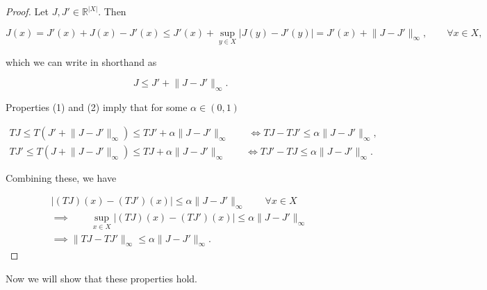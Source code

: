 \begin{proof}

Let \(J, J' \in \mathbb{R}^{|X|}\). Then

\[
J(x) = J'(x) + J(x) - J'(x) \leq J'(x) + \sup_{y \in X} \left| J(y) - J'(y) \right| = J'(x) + \lVert J - J' \rVert_\infty, \qquad \forall x \in X,
\]

which we can write in shorthand as

\[
J \leq J' + \lVert J - J' \rVert_\infty.
\]

Properties (1) and (2) imply that for some \(\alpha \in (0,1)\)

\begin{multline*}
TJ \leq T(J' + \lVert J - J' \rVert_\infty) \leq TJ' +  \alpha \lVert J - J' \rVert_\infty \qquad \iff TJ- TJ' \leq \alpha \lVert J - J' \rVert_\infty,  
\\ TJ' \leq T(J + \lVert J - J' \rVert_\infty) \leq TJ +  \alpha \lVert J - J' \rVert_\infty \qquad \iff TJ' - TJ \leq \alpha \lVert J - J' \rVert_\infty.
\end{multline*}

Combining these, we have

\begin{multline*}
 \left| (TJ)(x) - (TJ')(x)  \right|  \leq \alpha \lVert J - J' \rVert_\infty \qquad \forall x \in X
\\ \implies \qquad \sup_{x \in X} \left|  (TJ)(x) - (TJ')(x) \right|  \leq \alpha  \lVert J - J' \rVert_\infty \
\\ \implies \lVert TJ - TJ' \rVert_\infty \leq \alpha \lVert J - J' \rVert_\infty.
\end{multline*}

\end{proof}

Now we will show that these properties hold.




 
 



